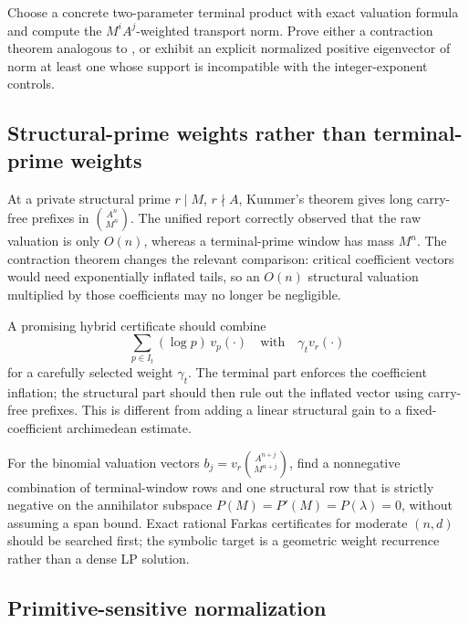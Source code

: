 \documentclass[11pt,oneside]{article}
\theoremstyle{definition}
\theoremstyle{remark}
\begin{document}
\begin{opentarget}
Choose a concrete two-parameter terminal product with exact valuation formula and compute the
$M^iA^j$-weighted transport norm.  Prove either a contraction theorem analogous to
, or exhibit an explicit normalized positive eigenvector of norm
at least one whose support is incompatible with the integer-exponent controls.
\end{opentarget}

\subsection{Structural-prime weights rather than terminal-prime weights}

At a private structural prime $r\mid M$, $r\nmid A$, Kummer's theorem gives long carry-free
prefixes in $\binom{A^n}{M^n}$.  The unified report correctly observed that the raw valuation
is only $O(n)$, whereas a terminal-prime window has mass $M^n$.  The contraction theorem
changes the relevant comparison: critical coefficient vectors would need exponentially
inflated tails, so an $O(n)$ structural valuation multiplied by those coefficients may no
longer be negligible.

A promising hybrid certificate should combine
\[
 \sum_{p\in I_t}(\log p)\,v_p(\cdot)
 \quad\text{with}\quad
 \gamma_t v_r(\cdot)
\]
for a carefully selected weight $\gamma_t$.  The terminal part enforces the coefficient
inflation; the structural part should then rule out the inflated vector using carry-free
prefixes.  This is different from adding a linear structural gain to a fixed-coefficient
archimedean estimate.

\begin{opentarget}
For the binomial valuation vectors
$b_j=v_r\binom{A^{n+j}}{M^{n+j}}$, find a nonnegative combination of terminal-window rows and
one structural row that is strictly negative on the annihilator subspace
$P(M)=P'(M)=P(\lambda)=0$, without assuming a span bound.  Exact rational Farkas certificates
for moderate $(n,d)$ should be searched first; the symbolic target is a geometric weight
recurrence rather than a dense LP solution.
\end{opentarget}

\subsection{Primitive-sensitive normalization}
\end{document}
